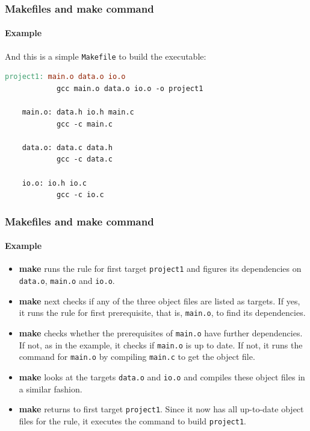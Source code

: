 \documentclass[11pt]{beamer}
\begin{document}
\begin{frame}[fragile]
  \frametitle{Makefiles and make command}
  \framesubtitle{Example}

  And this is a simple \texttt{Makefile} to build the executable:

  \vspace{5mm}
  \begin{lstlisting}[language=make, frame=single]
    project1: main.o data.o io.o
            gcc main.o data.o io.o -o project1

    main.o: data.h io.h main.c
            gcc -c main.c

    data.o: data.c data.h
            gcc -c data.c

    io.o: io.h io.c
            gcc -c io.c
  \end{lstlisting}
\end{frame}


\begin{frame}[fragile]
  \frametitle{Makefiles and make command}
  \framesubtitle{Example}

  \small{
  \begin{itemize}
    \item \textbf{make} runs the rule for first target \texttt{project1} and
      figures its dependencies on \texttt{data.o}, \texttt{main.o} and
      \texttt{io.o}.
    \item \textbf{make} next checks if any of the three object files are
      listed as targets. If yes, it runs the rule for first prerequisite, that
      is, \texttt{main.o}, to find its dependencies.
    \item \textbf{make} checks whether the prerequisites of \texttt{main.o}
      have further dependencies. If not, as in the example, it checks if
      \texttt{main.o} is up to date. If not, it runs the command for
      \texttt{main.o} by compiling \texttt{main.c} to get the object file.
    \item \textbf{make} looks at the targets \texttt{data.o} and \texttt{io.o}
      and compiles these object files in a similar fashion.
    \item \textbf{make} returns to first target \texttt{project1}. Since it
      now has all up-to-date object files for the rule, it executes the
      command to build \texttt{project1}.
  \end{itemize}
  }

\end{frame}
\end{document}
